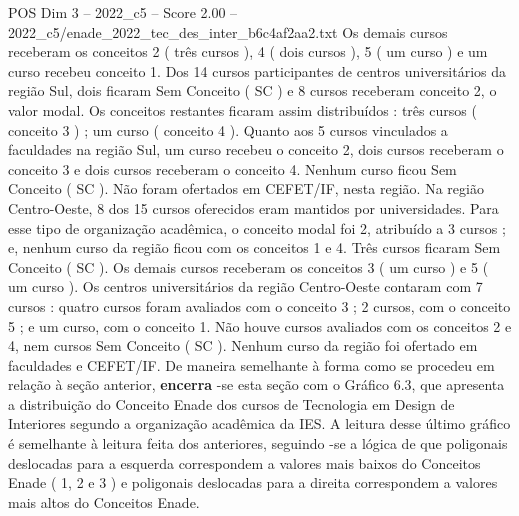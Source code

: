 \begin{textsample}{POS Dim 3 – 2022\_c5 – Score 2.00 – 2022\_c5/enade\_2022\_tec\_des\_inter\_b6c4af2aa2.txt}
Os demais cursos receberam os conceitos 2 ( três cursos ), 4 ( dois cursos ), 5 ( um curso ) e um curso recebeu conceito 1.
Dos 14 cursos participantes de centros universitários da região Sul, dois ficaram Sem Conceito ( SC ) e 8 cursos receberam conceito 2, o valor modal.
Os conceitos restantes ficaram assim distribuídos : três cursos ( conceito 3 ) ; um curso ( conceito 4 ).
Quanto aos 5 cursos vinculados a faculdades na região Sul, um curso recebeu o conceito 2, dois cursos receberam o conceito 3 e dois cursos receberam o conceito 4.
Nenhum curso ficou Sem Conceito ( SC ).
Não foram ofertados em CEFET/IF, nesta região.
Na região Centro-Oeste, 8 dos 15 cursos oferecidos eram mantidos por universidades.
Para esse tipo de organização acadêmica, o conceito modal foi 2, atribuído a 3 cursos ; e, nenhum curso da região ficou com os conceitos 1 e 4.
Três cursos ficaram Sem Conceito ( SC ).
Os demais cursos receberam os conceitos 3 ( um curso ) e 5 ( um curso ).
Os centros universitários da região Centro-Oeste contaram com 7 cursos : quatro cursos foram avaliados com o conceito 3 ; 2 cursos, com o conceito 5 ; e um curso, com o conceito 1.
Não houve cursos avaliados com os conceitos 2 e 4, nem cursos Sem Conceito ( SC ).
Nenhum curso da região foi ofertado em faculdades e CEFET/IF.
De maneira semelhante à forma como se procedeu em relação à seção anterior, \textbf{encerra} -se esta seção com o Gráfico 6.3, que apresenta a distribuição do Conceito Enade dos cursos de Tecnologia em Design de Interiores segundo a organização acadêmica da IES.
A leitura desse último gráfico é semelhante à leitura feita dos anteriores, seguindo -se a lógica de que poligonais deslocadas para a esquerda correspondem a valores mais baixos do Conceitos Enade ( 1, 2 e 3 ) e poligonais deslocadas para a direita correspondem a valores mais altos do Conceitos Enade.

\end{textsample}
